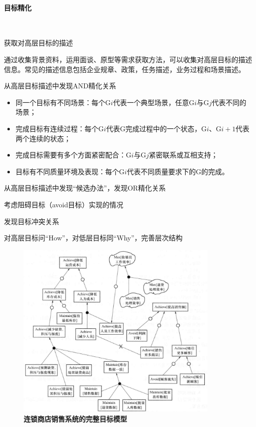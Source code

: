 \paragraph{目标精化}~{} \par

 获取对高层目标的描述

通过收集背景资料，运用面谈、原型等需求获取方法，可以收集对高层目标的描述信息。常见的描述信息包括企业规章、政策，任务描述，业务过程和场景描述。

 从高层目标描述中发现AND精化关系

\begin{itemize}
    \item 同一个目标有不同场景：每个G$i$代表一个典型场景，任意G$i$与G$j$代表不同的场景；
    \item 完成目标有连续过程：每个G$i$代表G完成过程中的一个状态，G$i$、G$i+1$代表两个连续的状态；
    \item 完成目标需要有多个方面紧密配合：G$i$与G$j$紧密联系或互相支持；
    \item 目标有不同质量环境及表现：每个G$i$代表不同质量要求下的G的完成。
\end{itemize}

 从高层目标描述中发现“候选办法”，发现OR精化关系

 考虑阻碍目标（avoid目标）实现的情况

 发现目标冲突关系

 对高层目标问“How”，对低层目标同“Why”，完善层次结构

\vspace{-2em}
\begin{figure}[H]
	\centering
	\includegraphics[width=0.88\textwidth]{img/连锁商店销售系统的完整目标模型.png}
    \caption*{\textbf{连锁商店销售系统的完整目标模型}}
\end{figure}
\vspace{-1em}

